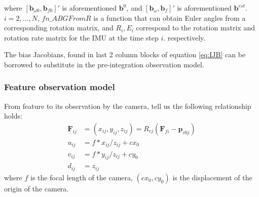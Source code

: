 \documentclass[12pt]{article}   %
\begin{document}
where $[\textbf{b}_{\omega0}, \textbf{b}_{f0}]'$ is aforementioned $\textbf{b}^{0}$, and $[\textbf{b}_\omega, \textbf{b}_f]'$  is aforementioned $\textbf{b}^{est}$. $i = 2,..., N$, $fn\_ABGFromR$ is a function that can obtain Euler angles from a corresponding rotation matrix, and $R_i, E_i$ correspond to the rotation matrix and rotation rate matrix for the IMU at the time step $i$. respectively.


The bias Jacobians, found in last 2 column blocks of equation \ref{eq:IJB} can be borrowed to substitute in the pre-integration observation model.

\subsubsection{Feature observation model}
From feature to its observation by the camera, \cite{multipleViewGeometry} tell us the following relationship holds:
\begin{align}
\textbf{F}_{ij} &= (x_{ij}, y_{ij}, z_{ij}) = R_{cj} (\textbf{F}_{fi} - \textbf{p}_{c0j}) \label{formu:pij} \\
u_{ij} &= f * x_{ij} / z_{ij} + cx_0 \label{formu:uij} \\
v_{ij} &= f * y_{ij} / z_{ij} + cy_0 \label{formu:vij} \\
d_{ij} &= z_{ij} \label{formu:dij}
\end{align}
where $f$ is the focal length of the camera, $(cx_0, cy_0)$ is the displacement of the origin of the camera.
\end{document}

